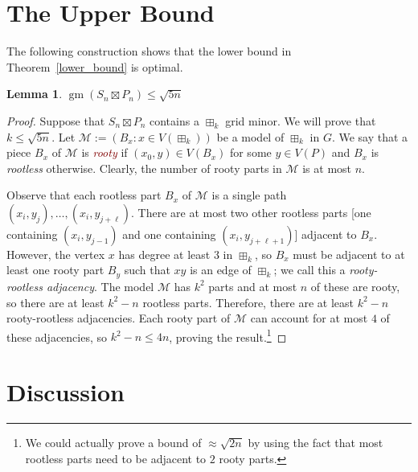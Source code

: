 \documentclass[kpfonts,lotsofwhite]{patmorin}
\newcommand{\defn}[1]{\textcolor{Maroon}{\emph{#1}}}
\renewcommand{\le}{\leqslant}
\DeclareMathOperator{\gm}{gm}
\theoremstyle{plain}
\newtheorem{lem}[thm]{Lemma}
\theoremstyle{definition}
\begin{document}
\section{The Upper Bound}

The following construction shows that the lower bound in Theorem~\ref{lower_bound} is optimal.

\begin{lem}\label{upper_bound}
  $\gm(S_n\boxtimes P_n)\le \sqrt{5n}$
\end{lem}

\begin{proof}
  Suppose that $S_n\boxtimes P_n$ contains a $\boxplus_k$ grid minor.  We will prove that $k\le\sqrt{5n}$.  Let $\mathcal{M}:=(B_x:x\in V(\boxplus_k))$ be a model of $\boxplus_k$ in $G$.  We say that a piece $B_x$ of $\mathcal{M}$ is \defn{rooty} if $(x_0,y)\in V(B_x)$ for some $y\in V(P)$ and $B_x$ is \emph{rootless} otherwise.  Clearly, the number of rooty parts in $\mathcal{M}$ is at most $n$.

  Observe that each rootless part $B_x$ of $\mathcal{M}$ is a single path $(x_i,y_j),\ldots,(x_i,y_{j+\ell})$.  There are at most two other rootless parts [one containing $(x_i,y_{j-1})$ and one containing $(x_i,y_{j+\ell+1})$] adjacent to $B_x$.  However, the vertex $x$ has degree at least $3$ in $\boxplus_k$, so $B_x$ must be adjacent to at least one rooty part $B_y$ such that $xy$ is an edge of $\boxplus_k$; we call this a \emph{rooty-rootless adjacency}. The model $\mathcal{M}$ has $k^2$ parts and at most $n$ of these are rooty, so there are at least $k^2-n$ rootless parts.  Therefore, there are at least $k^2-n$ rooty-rootless adjacencies.  Each rooty part of $\mathcal{M}$ can account for at most $4$ of these adjacencies, so $k^2-n \le 4n$, proving the result.\footnote{We could actually prove a bound of $\approx\sqrt{2n}$ by using the fact that most rootless parts need to be adjacent to $2$ rooty parts.}
\end{proof}

\section{Discussion}
\end{document}
